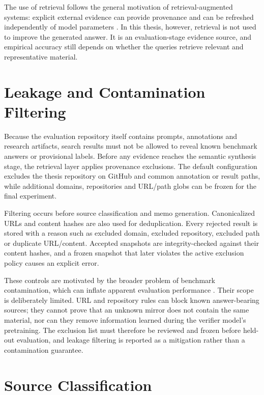 The use of retrieval follows the general motivation of retrieval-augmented systems: explicit external evidence can provide provenance and can be refreshed independently of model parameters \parencite{lewis2020rag}. In this thesis, however, retrieval is not used to improve the generated answer. It is an evaluation-stage evidence source, and empirical accuracy still depends on whether the queries retrieve relevant and representative material.

\section{Leakage and Contamination Filtering}
\label{sec:leakage-filtering}

Because the evaluation repository itself contains prompts, annotations and research artifacts, search results must not be allowed to reveal known benchmark answers or provisional labels. Before any evidence reaches the semantic synthesis stage, the retrieval layer applies provenance exclusions. The default configuration excludes the thesis repository on GitHub and common annotation or result paths, while additional domains, repositories and URL/path globs can be frozen for the final experiment.

Filtering occurs before source classification and memo generation. Canonicalized URLs and content hashes are also used for deduplication. Every rejected result is stored with a reason such as excluded domain, excluded repository, excluded path or duplicate URL/content. Accepted snapshots are integrity-checked against their content hashes, and a frozen snapshot that later violates the active exclusion policy causes an explicit error.

These controls are motivated by the broader problem of benchmark contamination, which can inflate apparent evaluation performance \parencite{deng2024contamination}. Their scope is deliberately limited. URL and repository rules can block known answer-bearing sources; they cannot prove that an unknown mirror does not contain the same material, nor can they remove information learned during the verifier model's pretraining. The exclusion list must therefore be reviewed and frozen before held-out evaluation, and leakage filtering is reported as a mitigation rather than a contamination guarantee.

\section{Source Classification}
\label{sec:source-classification}

